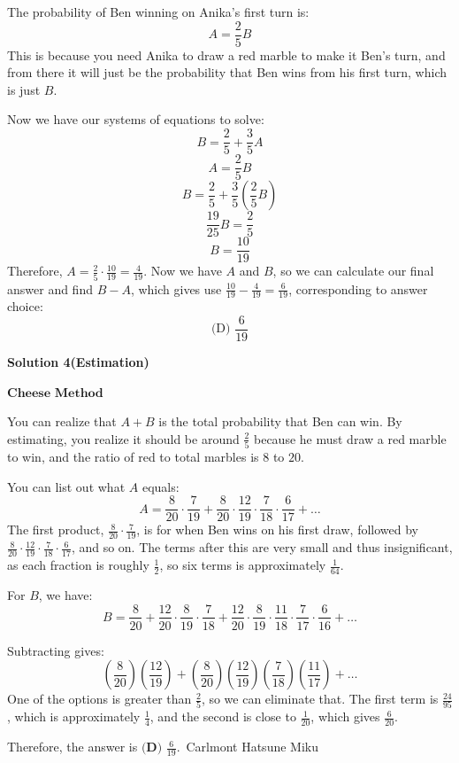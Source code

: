 \begin{enumerate}
 The probability of Ben winning on Anika's first turn is:
 \[A=\frac{2}{5} B\]This is because you need Anika to draw a red marble to make it Ben's turn, and from there it will just be the probability that Ben wins from his first turn, which is just $B$.

 Now we have our systems of equations to solve:
 \[B=\frac{2}{5}+\frac{3}{5}A\]
 \[A=\frac{2}{5}B\]
 \[B=\frac{2}{5}+\frac{3}{5}{\left(\frac{2}{5}B \right)}\]
 \[\frac{19}{25}B=\frac{2}{5}\]
 \[B=\frac{10}{19}\]Therefore, $A=\frac{2}{5} \cdot \frac{10}{19}=\frac{4}{19}$. Now we have $A$ and $B$, so we can calculate our final answer and find $B-A$, which gives use $\frac{10}{19}-\frac{4}{19}=\frac{6}{19}$, corresponding to answer choice:
 \[\boxed{\text{(D) } \frac{6}{19}}\]




\textbf{Solution 4(Estimation)}

$\textbf{Cheese Method}$

 You can realize that $A + B$ is the total probability that Ben can win. By estimating, you realize it should be around $\frac{2}{5}$ because he must draw a red marble to win, and the ratio of red to total marbles is $8$ to $20$. 

 You can list out what $A$ equals:
 \[A = \frac{8}{20} \cdot \frac{7}{19} + \frac{8}{20} \cdot \frac{12}{19} \cdot \frac{7}{18} \cdot \frac{6}{17} + \dots\]The first product, $\frac{8}{20} \cdot \frac{7}{19}$, is for when Ben wins on his first draw, followed by $\frac{8}{20} \cdot \frac{12}{19} \cdot \frac{7}{18} \cdot \frac{6}{17}$, and so on. The terms after this are very small and thus insignificant, as each fraction is roughly $\frac{1}{2}$, so six terms is approximately $\frac{1}{64}$. 

 For $B$, we have:
 \[B = \frac{8}{20} + \frac{12}{20} \cdot \frac{8}{19} \cdot \frac{7}{18} + \frac{12}{20} \cdot \frac{8}{19} \cdot \frac{11}{18} \cdot \frac{7}{17} \cdot \frac{6}{16} + \dots\]

 Subtracting gives:
 \[\left(\frac{8}{20}\right)\left(\frac{12}{19}\right) + \left(\frac{8}{20}\right)\left(\frac{12}{19}\right)\left(\frac{7}{18}\right)\left(\frac{11}{17}\right) + \dots\]One of the options is greater than $\frac{2}{5}$, so we can eliminate that. The first term is $\frac{24}{95}$, which is approximately $\frac{1}{4}$, and the second is close to $\frac{1}{20}$, which gives $\frac{6}{20}$. 

 Therefore, the answer is $\boxed{\textbf{(D) }\frac{6}{19}}$.~Carlmont Hatsune Miku


\end{enumerate}
